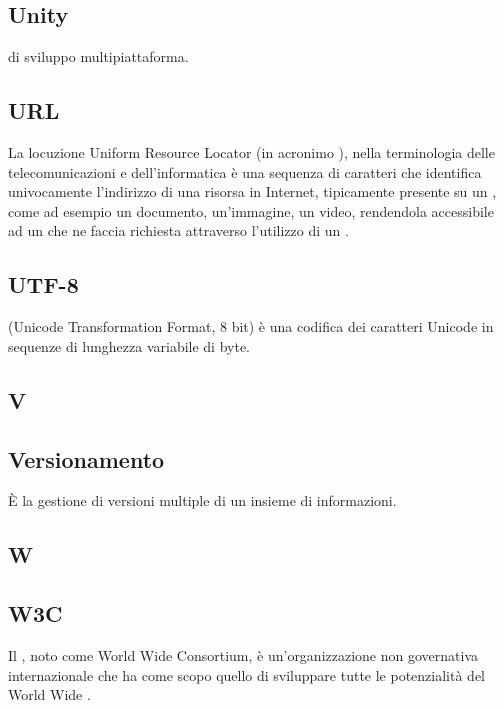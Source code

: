 \subsection*{Unity}
 di sviluppo multipiattaforma.

\subsection*{URL}
La locuzione Uniform Resource Locator (in acronimo ), nella terminologia delle telecomunicazioni e dell'informatica è una sequenza di caratteri che identifica univocamente l'indirizzo di una risorsa in Internet, tipicamente presente su un  , come ad esempio un documento, un'immagine, un video, rendendola accessibile ad un  che ne faccia richiesta attraverso l'utilizzo di un  .

\subsection*{UTF-8}
 (Unicode Transformation Format, 8 bit) è una codifica dei caratteri Unicode in sequenze di lunghezza variabile di byte.

\newpage

\begin{center}
\Huge\section*{\uppercase{V}}
\end{center}

\subsection*{Versionamento}
È la gestione di versioni multiple di un insieme di informazioni.

\newpage

\begin{center}
\Huge\section*{\uppercase{W}}
\end{center}

\subsection*{W3C}
Il , noto come World Wide  Consortium, è un'organizzazione non governativa internazionale che ha come scopo quello di sviluppare tutte le potenzialità del World Wide .

